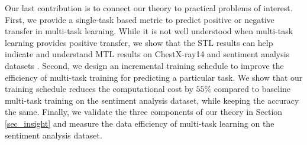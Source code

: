 Our last contribution is to connect our theory to practical problems of interest.
First, we provide a single-task based metric to predict positive or negative transfer in multi-task learning.
While it is not well understood when multi-task learning provides positive transfer, we show that the STL results can help indicate and understand MTL results on ChestX-ray14 \cite{chexnet17} and sentiment analysis datasets \cite{LZWDA18}.
Second, we design an incremental training schedule to improve the efficiency of multi-task training for predicting a particular task.
We show that our training schedule reduces the computational cost by $55\%$ compared to baseline multi-task training on the sentiment analysis dataset, while keeping the accuracy the same.
Finally, we validate the three components of our theory in Section \ref{sec_insight} and measure the data efficiency of multi-task learning on the sentiment analysis dataset.

